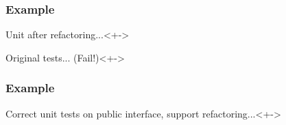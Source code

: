 \begin{frame}
	\frametitle{Example}
	\begin{block}{Unit after refactoring...}<+->
		
	\end{block}
	\begin{block}{Original tests... (Fail!)}<+->
		
	\end{block}
\end{frame}


\begin{frame}
	\frametitle{Example}
	\begin{block}{Correct unit tests on public interface, support refactoring...}<+->
		
	\end{block}
\end{frame}


